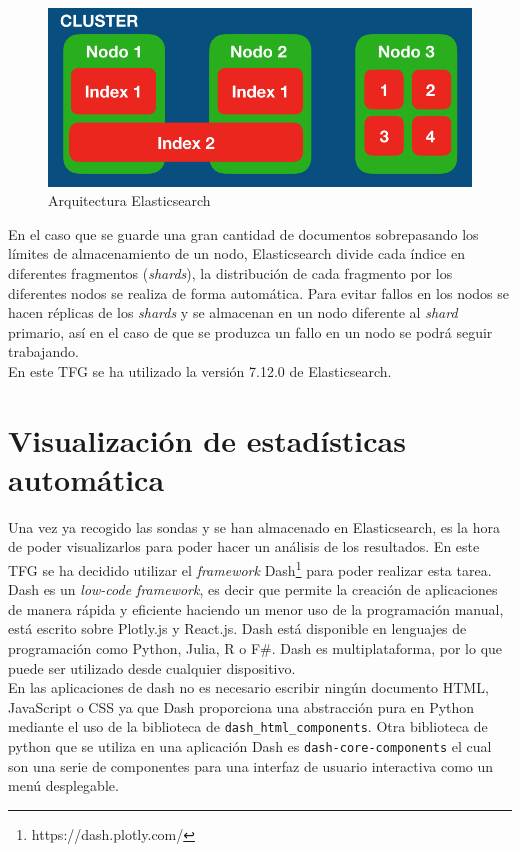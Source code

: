 \begin{figure}[H]
    \centering
    \includegraphics[width=12cm, keepaspectratio]{img/arquitectura_elastic.png}
    \caption{Arquitectura Elasticsearch}
    \label{fig:elastic}
\end{figure}
En el caso que se guarde una gran cantidad de documentos sobrepasando los límites de almacenamiento de un nodo, Elasticsearch divide cada índice en diferentes fragmentos (\textit{shards}), la distribución de cada fragmento por los diferentes nodos se realiza de forma automática. Para evitar fallos en los nodos se hacen réplicas de los \textit{shards} y se almacenan en un nodo diferente al \textit{shard} primario, así en el caso de que se produzca un fallo en un nodo se podrá seguir trabajando.\\

En este TFG se ha utilizado la versión 7.12.0 de Elasticsearch.
\newpage

\section{Visualización de estadísticas automática}

Una vez ya recogido las sondas y se han almacenado en Elasticsearch, es la hora de poder visualizarlos para poder hacer un análisis de los resultados. En este TFG se ha decidido utilizar el \textit{framework }Dash\footnote{https://dash.plotly.com/} para poder realizar esta tarea. Dash es un \textit{low-code framework}, es decir que permite la creación de aplicaciones de manera rápida y eficiente haciendo un menor uso de la programación manual, está escrito sobre Plotly.js y React.js. Dash está disponible en lenguajes de programación como Python, Julia, R o F#. Dash es multiplataforma, por lo que puede ser utilizado desde cualquier dispositivo.\cite{dash}\\

En las aplicaciones de dash no es necesario escribir ningún documento HTML, JavaScript o CSS ya que Dash proporciona una abstracción pura en Python mediante el uso de la biblioteca de \texttt{dash\_html\_components}. Otra biblioteca de python que se utiliza en una aplicación Dash es \texttt{dash-core-components} el cual son una serie de componentes para una interfaz de usuario interactiva como un menú desplegable.\\

